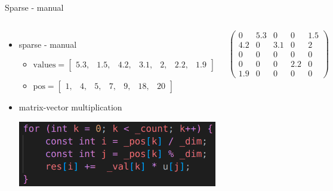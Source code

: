 \documentclass[aspectratio=169,xcolor=dvipsnames]{beamer}
\begin{document}

\begin{frame}{Sparse - manual}
    \begin{columns}[c] %

\begin{itemize}
\item sparse - manual
  \begin{itemize}
     	\item $\mathrm{values} =  \begin{bmatrix} 
		5.3, & 1.5, & 4.2, & 3.1, & 2, & 2.2, & 1.9 
		\end{bmatrix}$

		\item $\mathrm{pos} = \begin{bmatrix}
		1, & 4, & 5, & 7, & 9, & 18, & 20 
		\end{bmatrix}$
	\end{itemize}
\item matrix-vector multiplication
\begin{center}
    \includegraphics[width=0.8\linewidth]{matrix_vector_man2.png}
    \end{center}
\end{itemize}

        
        $ \left( \begin{array}{rrrrr} 
0 & 5.3 & 0 & 0 & 1.5\\ 
4.2 & 0& 3.1 & 0 & 2\\ 
0 & 0 & 0 & 0 & 0 \\
0 & 0 & 0 & 2.2 & 0 \\
1.9 & 0 & 0 & 0 & 0
\end{array} \right) $

    \end{columns}
\end{frame}

\end{document}
